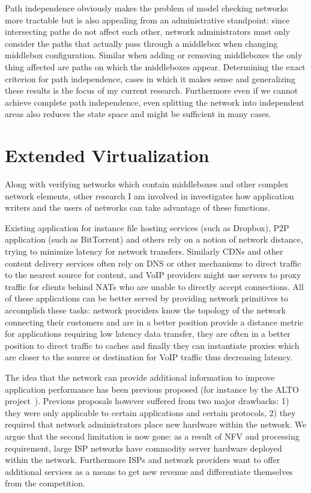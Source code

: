 \documentclass[letterpaper]{article}
\begin{document}
Path independence obviously makes the problem of model checking networks more tractable but is also appealing
from an administrative standpoint: since intersecting paths do not affect each other, network administrators
must only consider the paths that actually pass through a middlebox when changing middlebox configuration.
Similar when adding or removing middleboxes the only thing affected are paths on which the middleboxes appear.
Determining the exact criterion for path independence, cases in which it makes sense and generalizing these
results is the focus of my current research. Furthermore even if we cannot achieve complete path independence,
even splitting the network into independent areas also reduces the state space and might be sufficient in many
cases. 

\section*{Extended Virtualization}
Along with verifying networks which contain middleboxes and other complex network elements, other research I
am involved in investigates how application writers and the users of networks can take advantage of these
functions. 

Existing application for instance file hosting services (such as Dropbox), P2P application (such as
BitTorrent) and others rely on a notion of network distance, trying to minimize latency for network
transfers. Similarly CDNs and other content delivery services often rely on DNS or other mechanisms to direct
traffic to the nearest source for content, and VoIP providers might use servers to proxy traffic for clients
behind NATs who are unable to directly accept connections. All of these applications can be better served by
providing network primitives to accomplish these tasks: network providers know the topology of the network
connecting their customers and are in a better position provide a distance metric for applications requiring
low latency data transfer, they are often in a better position to direct traffic to caches and finally they
can instantiate proxies which are closer to the source or destination for VoIP traffic thus decreasing
latency.

The idea that the network can provide additional information to improve application performance has been
previous proposed (for instance by the ALTO project~\cite{seedorf2009traffic}). Previous proposals however
suffered from two major drawbacks: 1) they were only applicable to certain applications and certain
protocols, 2) they required that network administrators place new hardware within the network. We argue that
the second limitation is now gone: as a result of NFV and processing requirement, large ISP networks have
commodity server hardware deployed within the network. Furthermore ISPs and network providers want to offer
additional services as a means to get new revenue and differentiate themselves from the competition.
\end{document}
